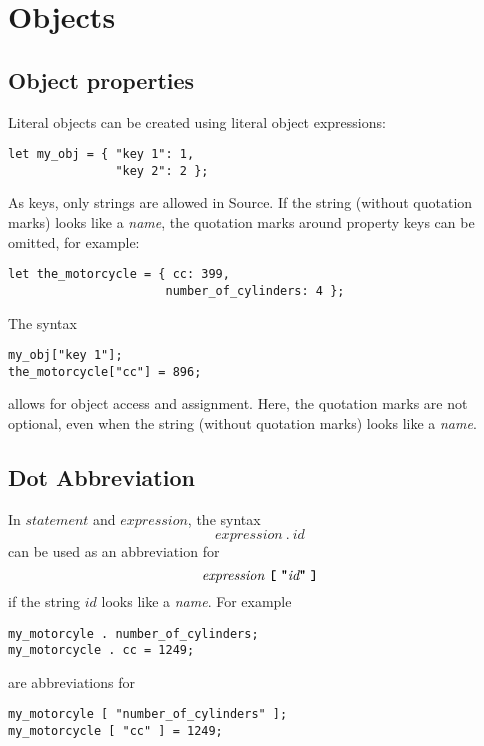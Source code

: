 \section*{Objects}

\subsection*{Object properties}

Literal objects can be created using literal object expressions:
\begin{lstlisting}
let my_obj = { "key 1": 1,
               "key 2": 2 };
\end{lstlisting}

As keys, only strings are allowed in Source.
If the string (without quotation marks) looks like a \textit{name}, the
quotation marks around property keys can be omitted, for example:
\begin{lstlisting}
let the_motorcycle = { cc: 399,
                      number_of_cylinders: 4 };
\end{lstlisting}

The syntax
\begin{lstlisting}
my_obj["key 1"];
the_motorcycle["cc"] = 896;
\end{lstlisting}
allows for object access and assignment. Here, the quotation marks are not optional,
even when the string (without quotation marks) looks like a \textit{name}.

\subsection*{Dot Abbreviation}

In $\textit{statement}$ and $\textit{expression}$, the syntax
\[
\textit{expression} \ \texttt{.}\ \textit{id}
\]
can be used as an abbreviation for
\[
\textit{expression} \ \textbf{\texttt{[}}\  \texttt{\bf "} \textit{id}
\texttt{\bf "}\ \textbf{\texttt{]}}
\]
if the string $\textit{id}$ looks like a \textit{name}.
For example
\begin{lstlisting}
my_motorcyle . number_of_cylinders;
my_motorcycle . cc = 1249;
\end{lstlisting}
are abbreviations for
\begin{lstlisting}
my_motorcyle [ "number_of_cylinders" ];
my_motorcycle [ "cc" ] = 1249;
\end{lstlisting}
